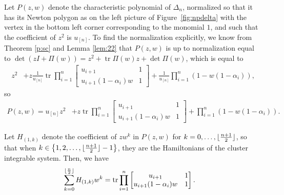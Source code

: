 \documentclass[pdftex]{sigma}
\numberwithin{equation}{section}
\DeclarePairedDelimiter\floor{\lfloor}{\rfloor}
\DeclareMathOperator{\tr}{tr}
\begin{document}
	Let $P(z,w)$ denote the characteristic polynomial of $\Delta_n$, normalized so that it has its Newton polygon as {on the left picture of} Figure~\ref{fig:npdelta} with the vertex in the bottom left corner corresponding to the monomial $1$, and such that the coefficient of $z^2$ is $u_{[n]}$. To find the normalization explicitly, we know from Theorem \ref{p:sc} and Lemma \ref{lem:22} that $P(z,w)$ is up to normalization equal to $\det (zI+\Pi(w)) = z^2+\tr \Pi(w) z + \det \Pi(w)$, which is equal to
	\begin{align*}
		z^2 &+z \frac{1}{u_{[n]}} \tr \prod_{i=1}^{ n }\begin{bmatrix}
			u_{i+1}&1\\
			u_{i+1}(1-\alpha_{i})w &1
		\end{bmatrix} + \frac{1}{u_{[n]}} \prod_{i=1}^n (1-w(1-\alpha_i)),
	\end{align*}
	so
	\begin{align*}
		P(z,w)=u_{[n]}z^2 &+z \tr \prod_{i=1}^{ n }\begin{bmatrix}
			u_{i+1}&1\\
			u_{i+1}(1-\alpha_{i})w &1
		\end{bmatrix} + \prod_{i=1}^n (1-w(1-\alpha_i)).
	\end{align*}
	
	Let $H_{(1,k)}$ denote the coefficient of $z w^k$ in $P(z,w)$ for $k=0,\dots,\floor{\frac{n+1}{2}}$, so that when ${k \in \bigl\{1,2,\dots,\floor{\frac{n+1}{2}} -1\bigr\}}$, they are the Hamiltonians of the cluster integrable system. Then, we have
	\begin{align*}
		\sum_{k=0}^{\floor{\frac n 2}} H_{(1,k)} w^k &= \tr \prod_{i=1}^{ n }\begin{bmatrix}
			u_{i+1}&1\\
			u_{i+1}(1-\alpha_{i})w &1
		\end{bmatrix}.
	\end{align*}
	
\end{document}
